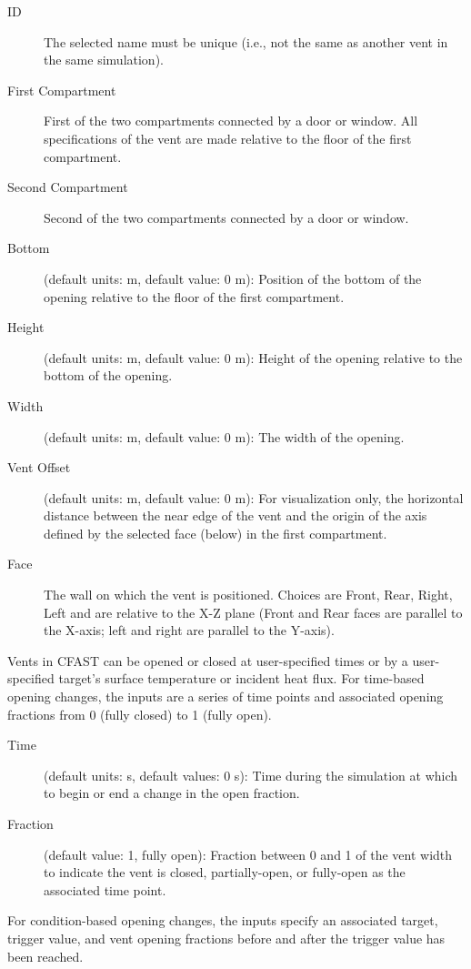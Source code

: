 \begin{description}
\item[ID] The selected name must be unique (i.e., not the same as another vent in the same simulation).
\item[First Compartment] First of the two compartments connected by a door or window. All specifications of the vent are made relative to the floor of the first compartment.
\item[Second Compartment] Second of the two compartments connected by a door or window.
\item[Bottom] (default units: m, default value: 0 m): Position of the bottom of the opening relative to the floor of the first compartment.
\item[Height] (default units: m, default value: 0 m): Height of the opening relative to the bottom of the opening.
\item[Width] (default units: m, default value: 0 m): The width of the opening.
\item[Vent Offset] (default units: m, default value: 0 m): For visualization only, the horizontal distance between the near edge of the vent and the origin of the axis defined by the selected face (below) in the first compartment.
\item[Face] The wall on which the vent is positioned.  Choices are Front, Rear, Right, Left and are relative to the X-Z plane (Front and Rear faces are parallel to the X-axis; left and right are parallel to the Y-axis).
\end{description}

Vents in CFAST can be opened or closed at user-specified times or by a user-specified target's surface temperature or incident heat flux. For time-based opening changes, the inputs are a series of time points and associated opening fractions from 0 (fully closed) to 1 (fully open).

\begin{description}
\item[Time] (default units: s, default values: 0 s): Time during the simulation at which to begin or end a change in the open fraction.
\item[Fraction] (default value: 1, fully open): Fraction between 0 and 1 of the vent width to indicate the vent is closed, partially-open, or fully-open as the associated time point.
\end{description}

For condition-based opening changes, the inputs specify an associated target, trigger value, and vent opening fractions before and after the trigger value has been reached.

